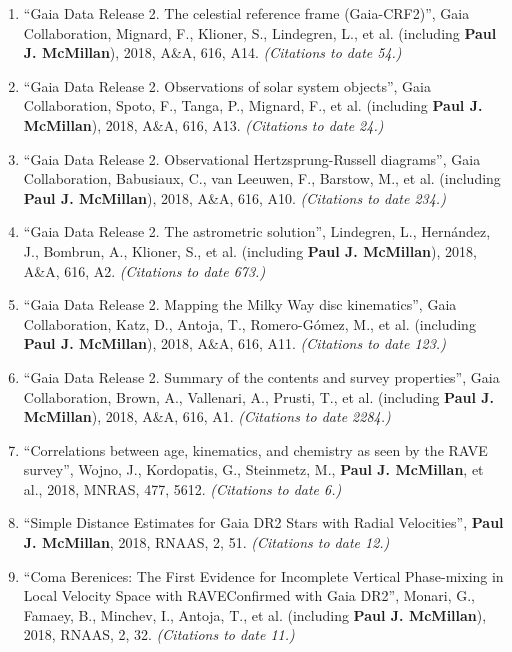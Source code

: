 \documentclass{resume}
\begin{document}
\begin{enumerate}
\item ``Gaia Data Release 2. The celestial reference frame (Gaia-CRF2)'', Gaia Collaboration, Mignard, F., Klioner, S., Lindegren, L., et al. (including \textbf{Paul J. McMillan}), 2018, A\&A, 616, A14. \textit{(Citations to date 54.)}

\item ``Gaia Data Release 2. Observations of solar system objects'', Gaia Collaboration, Spoto, F., Tanga, P., Mignard, F., et al. (including \textbf{Paul J. McMillan}), 2018, A\&A, 616, A13. \textit{(Citations to date 24.)}

\item ``Gaia Data Release 2. Observational Hertzsprung-Russell diagrams'', Gaia Collaboration, Babusiaux, C., van Leeuwen, F., Barstow, M., et al. (including \textbf{Paul J. McMillan}), 2018, A\&A, 616, A10. \textit{(Citations to date 234.)}

\item ``Gaia Data Release 2. The astrometric solution'', Lindegren, L., Hern\'andez, J., Bombrun, A., Klioner, S., et al. (including \textbf{Paul J. McMillan}), 2018, A\&A, 616, A2. \textit{(Citations to date 673.)}

\item ``Gaia Data Release 2. Mapping the Milky Way disc kinematics'', Gaia Collaboration, Katz, D., Antoja, T., Romero-G\'omez, M., et al. (including \textbf{Paul J. McMillan}), 2018, A\&A, 616, A11. \textit{(Citations to date 123.)}

\item ``Gaia Data Release 2. Summary of the contents and survey properties'', Gaia Collaboration, Brown, A., Vallenari, A., Prusti, T., et al. (including \textbf{Paul J. McMillan}), 2018, A\&A, 616, A1. \textit{(Citations to date 2284.)}

\item ``Correlations between age, kinematics, and chemistry as seen by the RAVE survey'', Wojno, J., Kordopatis, G., Steinmetz, M., \textbf{Paul J. McMillan}, et al., 2018, MNRAS, 477, 5612. \textit{(Citations to date 6.)}

\item ``Simple Distance Estimates for Gaia DR2 Stars with Radial Velocities'', \textbf{Paul J. McMillan}, 2018, RNAAS, 2, 51. \textit{(Citations to date 12.)}

\item ``Coma Berenices: The First Evidence for Incomplete Vertical Phase-mixing in Local Velocity Space with RAVE{\textemdash}Confirmed with Gaia DR2'', Monari, G., Famaey, B., Minchev, I., Antoja, T., et al. (including \textbf{Paul J. McMillan}), 2018, RNAAS, 2, 32. \textit{(Citations to date 11.)}


\end{enumerate}
\end{document}
